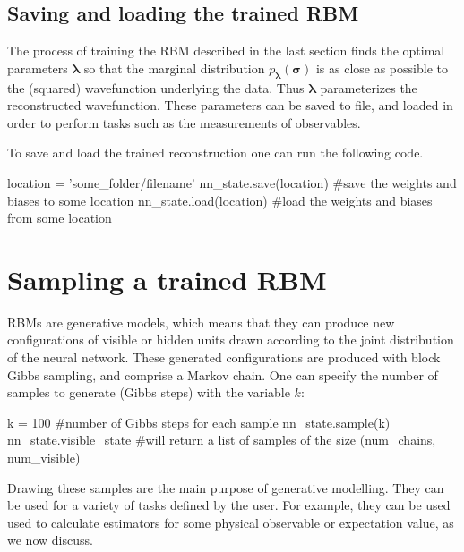\documentclass[submission, Phys]{SciPost}
\begin{document}
\subsection{Saving and loading the trained RBM}

The process of training the RBM described in the last section finds the optimal parameters $\bm{\lambda}$ so that 
the marginal distribution $p_{\bm{\lambda}} ( \bm{\sigma})$ is as close as possible to the (squared) wavefunction 
underlying the data.
Thus $\bm{\lambda}$ parameterizes the reconstructed wavefunction.  These parameters can be saved to file, and loaded in order to perform tasks such as the measurements of observables.

To save and load the trained reconstruction one can run the following code.

\begin{python}
location = 'some_folder/filename'
nn_state.save(location) #save the weights and biases to some location
nn_state.load(location) #load the weights and biases from some location
\end{python}


\section{Sampling a trained RBM}
\label{Sec:Sampling_a-Trained_RBM}

RBMs are generative models, which means that they can produce new configurations of visible or hidden units drawn according 
to the joint distribution of the neural network.  These generated configurations are produced with block Gibbs sampling, and comprise a Markov chain.  One can specify the number of samples to generate (Gibbs steps) with the variable $k$:
\begin{python}
k = 100 #number of Gibbs steps for each sample
nn_state.sample(k)
nn_state.visible_state #will return a list of samples of the size (num_chains, num_visible)
\end{python}
Drawing these samples are the main purpose of generative modelling.  They can be used for a variety of tasks defined by the user.  For example, they can be used used to calculate estimators for some physical observable or expectation value, as we now discuss.
\end{document}
